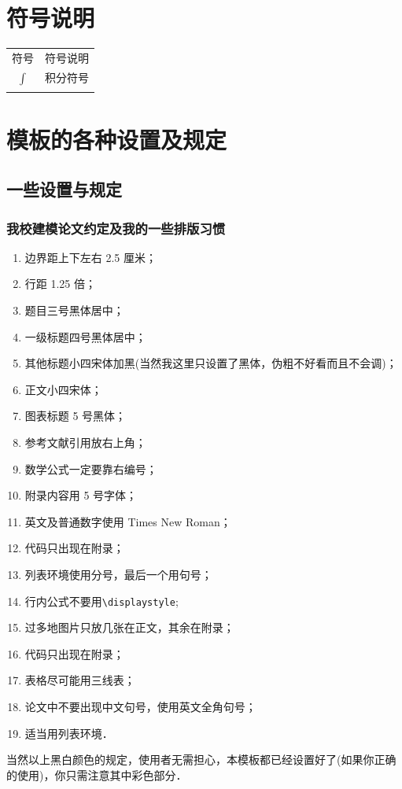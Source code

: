\documentclass{JXUSTmodeling}
\begin{document}
    \section{符号说明}\label{sec:3}
    \begin{center}
        \begin{tabularx}{0.5\textwidth}{c@{\hspace{1pc}}|@{\hspace{1pc}}X}
            \Xhline{0.08em}
            符号 & \multicolumn{1}{c}{符号说明}\\
            \Xhline{0.05em}
            $\int$ & 积分符号\\
            \Xhline{0.08em}
        \end{tabularx}
    \end{center}

    \section{模板的各种设置及规定}\label{sec:4}
    \subsection{一些设置与规定}\label{sub:4.1}
    \subsubsection{我校建模论文约定及我的一些排版习惯}
    \begin{enumerate}
    \item 边界距上下左右 2.5 厘米；
    \item 行距 1.25 倍；
    \item 题目三号黑体居中；
    \item 一级标题四号黑体居中；
    \item 其他标题小四宋体加黑(当然我这里只设置了黑体，伪粗不好看而且不会调)；
    \item 正文小四宋体；
    \item 图表标题 5 号黑体；
    \item 参考文献引用放右上角；
    \item 数学公式一定要靠右编号；
    \item 附录内容用 5 号字体；
    \item 英文及普通数字使用 Times New Roman；
    \item {\color{red} 代码只出现在附录}；
    \item {\color{red} 列表环境使用分号，最后一个用句号}；
    \item {\color{red} 行内公式不要用\verb|\displaystyle|};
    \item {\color{red} 过多地图片只放几张在正文，其余在附录}；
    \item {\color{red} 代码只出现在附录}；
    \item {\color{red} 表格尽可能用三线表}；
    \item {\color{red} 论文中不要出现中文句号，使用英文全角句号}；
    \item {\color{red} 适当用列表环境}．
   \end{enumerate}
   当然以上黑白颜色的规定，使用者无需担心，本模板都已经设置好了(如果你正确的使用)，你只需注意其中彩色部分．
\end{document}

